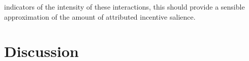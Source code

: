 indicators of the intensity of these interactions, this should provide a sensible approximation of the amount of attributed incentive salience. 


\section{Discussion}